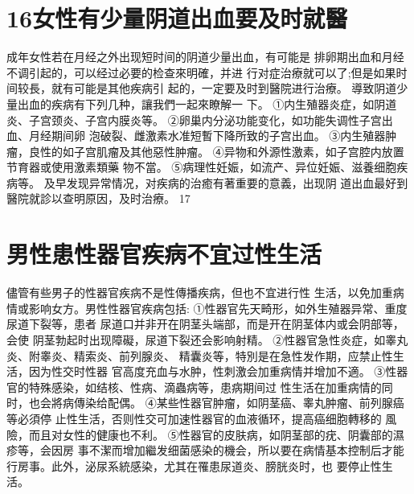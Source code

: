 \documentclass[12pt,UTF8]{ctexbook}
\begin{document}
\section{16女性有少量阴道出血要及时就醫}
成年女性若在月经之外出现短时间的阴道少量出血，有可能是
排卵期出血和月经不调引起的，可以经过必要的检查來明確，并进
行对症治療就可以了;但是如果时间较長，就有可能是其他疾病引
起的，一定要及时到醫院进行治療。
導致阴道少量出血的疾病有下列几种，讓我們一起來瞭解一
下。
①内生殖器炎症，如阴道炎、子宫颈炎、子宫内膜炎等。
②卵巢内分泌功能变化，如功能失调性子宫出血、月经期间卵
泡破裂、雌激素水准短暫下降所致的子宫出血。
③内生殖器肿瘤，良性的如子宫肌瘤及其他惡性肿瘤。
④异物和外源性激素，如子宫腔内放置节育器或使用激素類藥
物不當。
⑤病理性妊娠，如流产、异位妊娠、滋養细胞疾病等。
及早发现异常情况，对疾病的治癒有著重要的意義，出现阴
道出血最好到醫院就診以查明原因，及时治療。
17
\section{男性患性器官疾病不宜过性生活}
儘管有些男子的性器官疾病不是性傳播疾病，但也不宜进行性
生活，以免加重病情或影响女方。男性性器官疾病包括:
①性器官先天畸形，如外生殖器异常、重度尿道下裂等，患者
尿道口并非开在阴茎头端部，而是开在阴茎体内或会阴部等，会使
阴茎勃起时出现障礙，尿道下裂还会影响射精。
②性器官急性炎症，如睾丸炎、附睾炎、精索炎、前列腺炎、
精囊炎等，特別是在急性发作期，应禁止性生活，因为性交时性器
官高度充血与水肿，性刺激会加重病情并增加不適。
③性器官的特殊感染，如结核、性病、滴蟲病等，患病期间过
性生活在加重病情的同时，也会將病傳染给配偶。
④某些性器官肿瘤，如阴茎癌、睾丸肿瘤、前列腺癌等必須停
止性生活，否则性交可加速性器官的血液循环，提高癌细胞轉移的
風險，而且对女性的健康也不利。
⑤性器官的皮肤病，如阴茎部的疣、阴囊部的濕疹等，会因房
事不潔而增加繼发细菌感染的機会，所以要在病情基本控制后才能
行房事。此外，泌尿系統感染，尤其在罹患尿道炎、膀胱炎时，也
要停止性生活。
\end{document}
